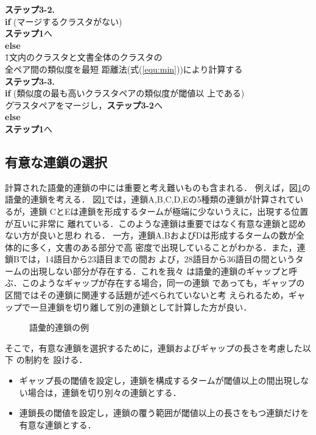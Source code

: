 \begin{tabbing}
\quad \= {\bf ステップ3-2.}\\
	\>\quad \= {\bf if} (マージするクラスタがない)\\
	\>\>\quad \= {\bf ステップ1}へ\\
	\>\quad \= {\bf else}\\
	\>\>\quad \= 1文内のクラスタと文書全体のクラスタの\\
	\>\>\>全ペア間の類似度を最短
	距離法(式(\ref{equ:min}))により計算する\\
\quad \= {\bf ステップ3-3.}\\
	\>\quad \= {\bf if} (類似度の最も高いクラスタペアの類似度が閾値以
	上である)\\
	\>\>\quad \= クラスタペアをマージし，{\bf ステップ3-2}へ\\
	\>\> {\bf else}\\
	\>\>\quad \= {\bf ステップ1}へ\\
\end{tabbing}

\subsection{有意な連鎖の選択}\label{ssec:lexselect}
計算された語彙的連鎖の中には重要と考え難いものも含まれる．
例えば，図\ref{fig:leximg}の語彙的連鎖を考える．
図\ref{fig:leximg}では，連鎖A,B,C,D,Eの5種類の連鎖が計算されているが，連鎖
CとEは連鎖を形成するタームが極端に少ないうえに，出現する位置が互いに非常に
離れている．このような連鎖は重要ではなく有意な連鎖と認めない方が良いと思わ
れる．
一方，連鎖A,BおよびDは形成するタームの数が全体的に多く，文書のある部分で高
密度で出現していることがわかる．また，連鎖Bでは，14語目から23語目までの間お
よび，28語目から36語目の間というタームの出現しない部分が存在する．これを我々
は語彙的連鎖のギャップと呼ぶ．このようなギャップが存在する場合，同一の連鎖
であっても，ギャップの区間ではその連鎖に関連する話題が述べられていないと考
えられるため，ギャップで一旦連鎖を切り離して別の連鎖として計算した方が良い．

\begin{figure}[htbp]
\begin{center}
\caption{語彙的連鎖の例}
\label{fig:leximg}
\end{center}
\end{figure}

そこで，有意な連鎖を選択するために，連鎖およびギャップの長さを考慮した以下
の制約を
設ける．

\begin{itemize}
\item ギャップ長の閾値を設定し，連鎖を構成するタームが閾値以上の間出現しな
	い場合は，連鎖を切り別々の連鎖とする．
\item 連鎖長の閾値を設定し，連鎖の覆う範囲が閾値以上の長さをもつ連鎖だけを
有意な連鎖とする．
\end{itemize}

